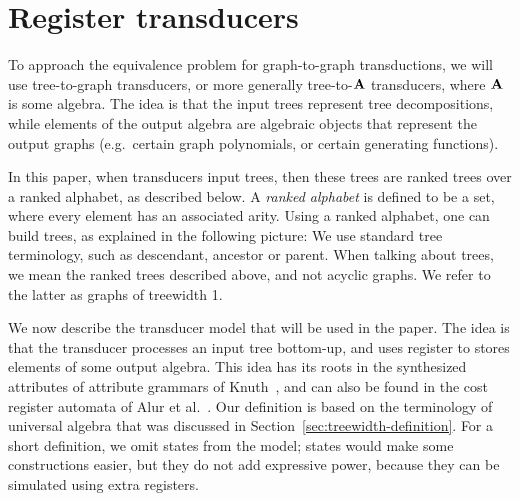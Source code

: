 \section{Register transducers}
To approach the equivalence problem for graph-to-graph transductions, we will use tree-to-graph  transducers, or more generally tree-to-$\mathbf{A}$ transducers, where $\mathbf{A}$ is some algebra. The idea is that the input trees represent tree decompositions, while elements of the output algebra are algebraic objects that represent the output graphs (e.g.~certain graph polynomials, or certain generating functions). 

In this paper, when transducers input trees, then these trees are  ranked trees over a ranked alphabet, as described below. A \emph{ranked alphabet} is defined to be  a set, where every element has an associated arity. Using a ranked alphabet, one can build trees, as explained in the following picture:
We use standard tree terminology, such as descendant, ancestor or parent. When talking about trees, we mean the ranked trees described above, and not acyclic graphs. We refer to the latter as graphs of treewidth 1. 

We now describe the transducer model that will be used in the paper. The idea is that the transducer processes an input tree bottom-up, and uses register to stores elements of some output algebra.  This idea has its roots in the synthesized attributes of attribute grammars of Knuth~\cite{Knuth:1968aa}, and can also be found in the cost register automata of Alur et al.~\cite[p.~15]{alurDantoniDeshmukhYuan2013}. Our definition is based on the terminology of universal algebra that was discussed in Section~\ref{sec:treewidth-definition}.
For a short definition, we omit states from the model; states would make some constructions easier, but they do not add expressive power, because they  can be simulated using extra registers.

